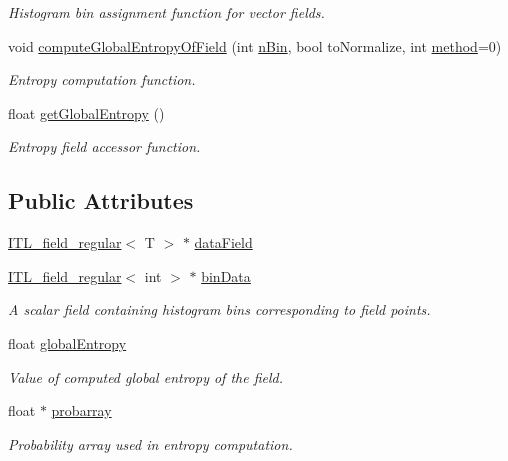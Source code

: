 \begin{DoxyCompactItemize}
\begin{DoxyCompactList}\small\item\em Histogram bin assignment function for vector fields. \item\end{DoxyCompactList}\item 
void \hyperlink{classITL__globalentropy_ad6e98f40d85501050f6a055bd8218525}{computeGlobalEntropyOfField} (int \hyperlink{MainIT__regvector_8cpp_a7f13753d4707f6bc8f71d8bdacedefb3}{nBin}, bool toNormalize, int \hyperlink{MainIT__regscalar_8cpp_adcc9a19ad3119f823a658f6a49a24e64}{method}=0)
\begin{DoxyCompactList}\small\item\em Entropy computation function. \item\end{DoxyCompactList}\item 
float \hyperlink{classITL__globalentropy_a971ff6f68ca3399c374f52f24bb1232c}{getGlobalEntropy} ()
\begin{DoxyCompactList}\small\item\em Entropy field accessor function. \item\end{DoxyCompactList}\end{DoxyCompactItemize}
\subsection*{Public Attributes}
\begin{DoxyCompactItemize}
\item 
\hyperlink{classITL__field__regular}{ITL\_\-field\_\-regular}$<$ T $>$ $\ast$ \hyperlink{classITL__globalentropy_adc0074ac722c23f71868d43ed818e063}{dataField}
\item 
\hyperlink{classITL__field__regular}{ITL\_\-field\_\-regular}$<$ int $>$ $\ast$ \hyperlink{classITL__globalentropy_ac546157f722e8b579c020180a0473ea0}{binData}
\begin{DoxyCompactList}\small\item\em A scalar field containing histogram bins corresponding to field points. \item\end{DoxyCompactList}\item 
float \hyperlink{classITL__globalentropy_a462d47cb4eb2b6b7dae04113db7f301a}{globalEntropy}
\begin{DoxyCompactList}\small\item\em Value of computed global entropy of the field. \item\end{DoxyCompactList}\item 
float $\ast$ \hyperlink{classITL__globalentropy_a65aa14c47161756fa3dd18b171c232f1}{probarray}
\begin{DoxyCompactList}\small\item\em Probability array used in entropy computation. \item\end{DoxyCompactList}\end{DoxyCompactItemize}



